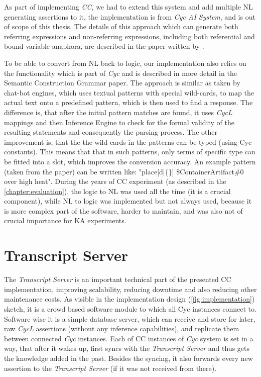 As part of implementing \emph{CC}, we had
to extend this system and add multiple NL generating assertions to it, the
implementation is from \emph{Cyc AI System}, and is out of scope of this 
thesis. The details of this approach which can generate both referring 
expressions and non-referring expressions, including both referential and 
bound variable anaphora, are described in the paper written by
\textcite{Coppock2010}. 

To be able to convert from NL back to logic, our implementation also relies on
the functionality which is part of \emph{Cyc} and is described in more detail
in the Semantic Construction Grammar paper\parencite{Schneider2015}. The 
approach is similar as
taken by chat-bot engines\parencite{Wilcox2011}, which uses textual patterns
with special wild-cards, to map the actual text onto a predefined pattern, which
is then used to find a response. The difference is, that after the initial 
pattern matches are found, it uses \emph{CycL} mappings and then Inference 
Engine to check for
the formal validity of the resulting statements and consequently the parsing 
process. The other improvement is, that the the wild-cards in the patterns
can be typed (using Cyc constants). This means that that in such patterns, 
only terms of specific type can be fitted into a slot, which improves the 
conversion accuracy. An example pattern (taken from the paper) can be written 
like: "place[d|\{\}] \$ContainerArtifact\#0 over high heat".
During the years of CC experiment (as described in the 
\autoref{chapter:evaluation}), the logic to NL was used all the time (it is a
crucial component), while NL to logic was implemented but not always used, 
because it is more complex part of the software, harder to maintain, and was
also not of crucial importance for KA experiments.

\section{Transcript Server}
\label{section:transcriptserver}
The \emph{Transcript Server} is an important technical part of the presented CC 
implementation, improving scalability, reducing downtime and also reducing
other maintenance costs. As visible in the implementation design 
(\autoref{fig:implementation}) sketch, it is a crowd based software module
to which all Cyc instances connect to. Software wise it is a simple database
server, which can receive and store for later, raw \emph{CycL} assertions 
(without any inference capabilities), and replicate them between 
connected \emph{Cyc} instances. Each of CC instances of \emph{Cyc} system is
set in a way, that after it wakes up, first syncs with the \emph{Transcript 
Server} and thus gets the knowledge added in the past. Besides the syncing,
it also forwards every new assertion to the \emph{Transcript Server} (if it was
not received from there). 

